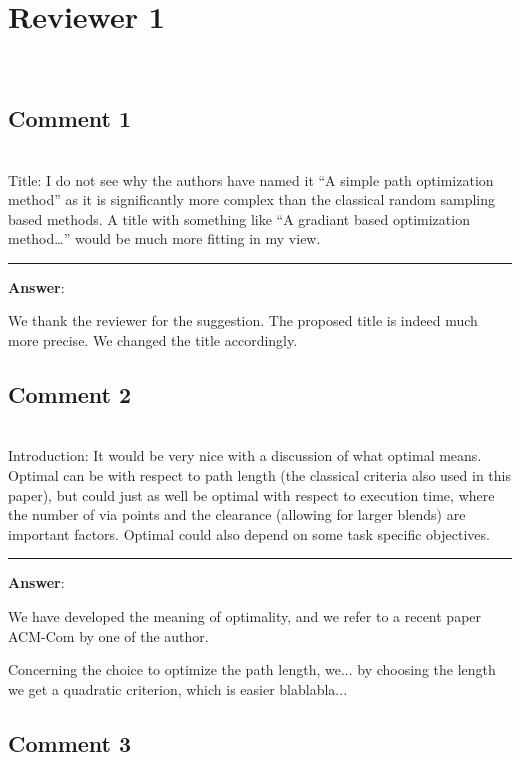 \documentclass{scrartcl}
\begin{document}
\section{Reviewer 1}
\label{r2}
\hrulefill\\

\subsection{Comment 1}
\hrulefill\\

Title:
I do not see why the authors have named it “A simple path optimization method” as it is significantly more complex than the classical random sampling based methods. A title with something like “A gradiant based optimization method…” would be much more fitting in my view.

\rule{\linewidth}{.1pt}
\textbf{Answer}:

We thank the reviewer for the suggestion. The proposed title is indeed much more precise. We changed the title accordingly.

\subsection{Comment 2}
\hrulefill\\

Introduction: 
It would be very nice with a discussion of what optimal means. Optimal can be with respect to path length (the classical criteria also used in this paper), but could just as well be optimal with respect to execution time, where the number of via points and the clearance (allowing for larger blends) are important factors. Optimal could also depend on some task specific objectives. 

\rule{\linewidth}{.1pt}
\textbf{Answer}:

We have developed the meaning of optimality, and we refer to a recent paper ACM-Com by one of the author.

Concerning the choice to optimize the path length, we... by choosing the length we get a quadratic criterion, which is easier blablabla...

\subsection{Comment 3}
\hrulefill\\
\end{document}
